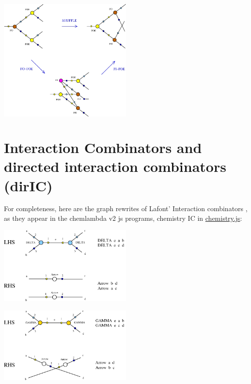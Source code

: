 \documentclass{article}
\begin{document}
\centerline{\includegraphics[width=0.5\textwidth]{../img/shuffle-FO-FOE.jpg}
}
\vspace{.5cm}




\section{Interaction Combinators and directed interaction combinators (dirIC)}
\label{IC}
\vspace{.5cm}
For completeness, here are the graph rewrites of Lafont' Interaction combinators \cite{lafont-comb}, as they appear in the chemlambda v2 js programs, chemistry IC in \href{https://github.com/mbuliga/quinegraphs/blob/master/js/chemistry.js}{chemistry.js}: 

\vspace{.5cm}
 
\centerline{\includegraphics[width=0.5\textwidth]{../img/DELTA-DELTA-arrow1.jpg}
}
\vspace{.5cm}

\centerline{\includegraphics[width=0.5\textwidth]{../img/GAMMA-GAMMA-arrow1.jpg}
}
\vspace{.5cm}
\end{document}
